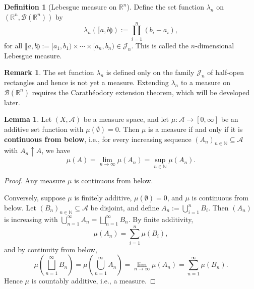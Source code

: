 \documentclass[12pt]{article}
\theoremstyle{definition}
\newtheorem{definition}{Definition}[section]
\newtheorem{lemma}[theorem]{Lemma}
\newtheorem{remark}{Remark}[section]
\begin{document}
\medskip
\begin{definition}[Lebesgue measure on \(\mathbb{R}^n\)]
Define the set function \(\lambda_n\) on \((\mathbb{R}^n, \mathcal{B}(\mathbb{R}^n))\) by
\[
\lambda_n\left( \llbracket a, b \rrparenthesis \right) := \prod_{i=1}^n (b_i - a_i),
\]
for all \(\llbracket a, b \rrparenthesis := [a_1, b_1) \times \cdots \times [a_n, b_n) \in \mathcal{J}_n\).  
This is called the \(n\)-dimensional Lebesgue measure.
\end{definition}

\begin{remark}
The set function \(\lambda_n\) is defined only on the family \(\mathcal{J}_n\) of half-open rectangles and hence is not yet a measure. Extending \(\lambda_n\) to a measure on \(\mathcal{B}(\mathbb{R}^n)\) requires the Carathéodory extension theorem, which will be developed later.
\end{remark}


\medskip
\begin{lemma}
Let \((X, \mathcal{A})\) be a measure space, and let \(\mu : \mathcal{A} \to [0, \infty]\) be an additive set function with \(\mu(\emptyset) = 0\). Then \(\mu\) is a measure if and only if it is \textbf{continuous from below}, i.e., for every increasing sequence \((A_n)_{n \in \mathbb{N}} \subseteq \mathcal{A}\) with \(A_n \uparrow A\), we have
\[
\mu(A) = \lim_{n \to \infty} \mu(A_n) = \sup_{n \in \mathbb{N}} \mu(A_n).
\]
\end{lemma}

\begin{proof}
Any measure \(\mu\) is continuous from below.

Conversely, suppose \(\mu\) is finitely additive, \(\mu(\emptyset) = 0\), and \(\mu\) is continuous from below. Let \((B_n)_{n \in \mathbb{N}} \subseteq \mathcal{A}\) be disjoint, and define \(A_n := \bigcup_{i=1}^n B_i\). Then \((A_n)\) is increasing with \(\bigcup_{n=1}^\infty A_n = \bigsqcup_{n=1}^\infty B_n\). By finite additivity,
\[
\mu(A_n) = \sum_{i=1}^n \mu(B_i),
\]
and by continuity from below,
\[
\mu\left(\bigsqcup_{n=1}^\infty B_n\right) = \mu\left(\bigcup_{n=1}^\infty A_n\right) = \lim_{n \to \infty} \mu(A_n) = \sum_{n=1}^\infty \mu(B_n).
\]
Hence \(\mu\) is countably additive, i.e., a measure.
\end{proof}
\end{document}
